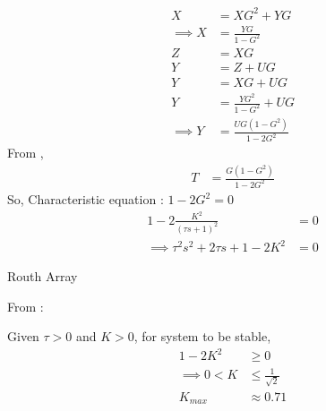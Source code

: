 \documentclass[journal,12pt,twocolumn]{IEEEtran}
\theoremstyle{remark}
\begin{document}
\begin{align}
X &= XG^2+YG \\
\implies X &= \frac{YG}{1-G^2}\\
Z &= XG\\
Y &= Z+UG\\
Y &= XG+UG\\
Y &= \frac{YG^2}{1-G^2}+UG\\
\implies Y &= \frac{UG(1-G^2)}{1-2G^2} 
\end{align}
From ,
\begin{align}
T &= \frac{G(1-G^2)}{1-2G^2}
\end{align}
So, Characteristic equation : $1-2G^2 = 0$ 
\begin{align}
1-2\frac{K^2}{(\tau s+1)^2}&= 0 \\
\implies \tau^2s^2+2\tau s+1-2K^2 &= 0
\end{align}
\begin{table}[htbp]
\setlength{\extrarowheight}{8pt}
\centering

\caption{Routh Array}
\label{tab:generalroutharray}
\end{table}
\newline
From :

\begin{table}[htbp]
\setlength{\extrarowheight}{8pt}
\centering

\caption{}
\label{tab:inputs.IN.24.2023}
\end{table}


Given $\tau>0$ and $K>0$, for system to be stable,
\begin{align}
1-2K^2&\geq 0\\
\implies 0 < K&\leq \frac{1}{\sqrt{2}}\\
K_{max} &\approx 0.71
\end{align}
\end{document}
